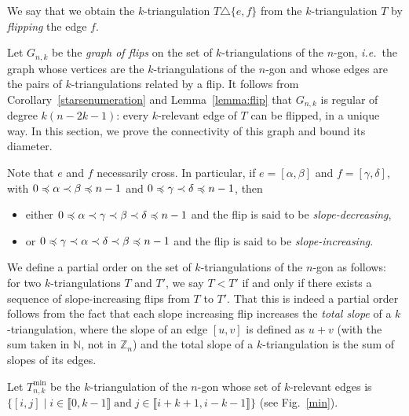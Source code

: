 \documentclass[12pt]{amsart}
\begin{document}
We say that we obtain the $k$-triangulation $T\triangle\{e,f\}$ from the $k$-triangulation $T$ by \emph{flipping} the edge $f$. 

Let $G_{n,k}$ be the \emph{graph of flips} on the set of $k$-triangulations of the $n$-gon, {\it i.e.}~the graph whose vertices are the $k$-triangulations of the $n$-gon and whose edges are the pairs of $k$-triangulations related by a flip.
It follows from Corollary~\ref{starsenumeration} and Lemma~\ref{lemma:flip} that $G_{n,k}$ is regular of degree $k(n-2k-1)$: every $k$-relevant edge of $T$ can be flipped, in a unique way. In this section, we prove the connectivity of this graph and bound its diameter.

\medskip
Note that $e$ and $f$ necessarily cross.
In particular, if $e=[\alpha,\beta]$ and $f=[\gamma,\delta]$, with $0\preccurlyeq\alpha\prec\beta\preccurlyeq n-1$ and $0\preccurlyeq\gamma\prec\delta\preccurlyeq n-1$, then
\begin{itemize}
\item either $0\preccurlyeq\alpha\prec\gamma\prec\beta\prec\delta\preccurlyeq n-1$ and the flip is said to be \emph{slope-decreasing},
\item or $0\preccurlyeq\gamma\prec\alpha\prec\delta\prec\beta\preccurlyeq n-1$ and the flip is said to be \emph{slope-increasing}.
\end{itemize}
We define a partial order on the set of $k$-triangulations of the $n$-gon as follows: for two $k$-triangulations $T$ and $T'$, we say $T<T'$ if and only if there exists a sequence of slope-increasing flips from $T$ to $T'$.
That this is indeed a partial order follows from the fact that each slope increasing flip increases the \emph{total slope} of a $k$-triangulation, where the slope of an edge $[u,v]$ is defined as $u+v$ (with the sum taken in $\mathbb{N}$, not in $\mathbb{Z}_{n}$)  and the total slope of a $k$-triangulation is the sum of slopes of its edges.


Let $T_{n,k}^{\min}$ be the $k$-triangulation of the $n$-gon whose set of $k$-relevant edges is $\{[i,j]\;|\;i\in\llbracket 0,k-1\rrbracket\;\mathrm{and}\;j\in\llbracket i+k+1,i-k-1\rrbracket\}$ (see Fig.~\ref{min}).
\end{document}
